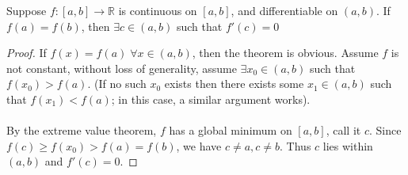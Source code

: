 \begin{theorem}
Suppose \(f:[a,b] \to \mathbb{R}\) is continuous on \([a,b]\), and differentiable on \((a,b)\). If \(f(a) = f(b)\), then \(\exists c \in (a,b)\) such that \(f'(c) = 0\)
\begin{center}
\end{center}
\end{theorem}
\begin{proof}
If \(f(x) = f(a) \; \forall x \in (a,b)\), then the theorem is obvious. Assume \(f\) is not constant, without loss of generality, assume \(\exists x_0 \in (a,b)\) such that \(f(x_0) > f(a)\). (If no such \(x_0\) exists then there exists some \(x_1 \in (a,b)\) such that \(f(x_1) < f(a)\); in this case, a similar argument works).
\\\\ %
By the extreme value theorem, \(f\) has a global minimum on \([a,b]\), call it \(c\). Since \(f(c) \geq f(x_0) > f(a) = f(b)\), we have \(c \neq a, c \neq b\). Thus \(c\) lies within \((a,b)\) and \(f'(c) = 0\).
\end{proof}

